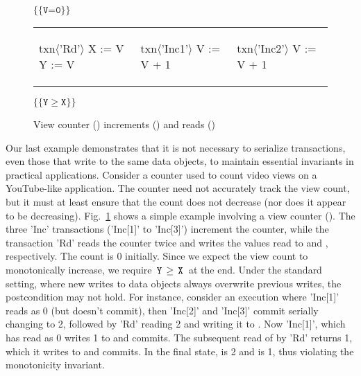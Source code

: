 \begin{figure}[t]
\centering
$\{\{\texttt{V=0}\}\}$
\begin{tabular}{l||l||l}
\begin{txnimpcode}
  txn$\langle$'Rd'$\rangle${
    X := V
    Y := V
  }
\end{txnimpcode}
&
\begin{txnimpcode}
  txn$\langle$'Inc1'$\rangle${
    V := V + 1
  }
\end{txnimpcode}
&
\begin{txnimpcode}
  txn$\langle$'Inc2'$\rangle${
    V := V + 1
  }
\end{txnimpcode}
\\
\end{tabular}
$\{\{\texttt{Y}\ge\texttt{X}\}\}$

\caption{View counter () increments () and reads ()}
\label{fig:motiv-eg-4}
\end{figure}

Our last example demonstrates that it is not necessary to serialize
transactions, even those that write to the same data objects, to
maintain essential invariants in practical applications. Consider a
counter used to count video views on a YouTube-like application. The
counter need not accurately track the view count, but it must at least
ensure that the count does not decrease (nor does it appear to be
decreasing). Fig.~\ref{fig:motiv-eg-4} shows a simple example
involving a view counter (). The three 'Inc' transactions
('Inc[1]' to 'Inc[3]') increment the counter, while the transaction
'Rd' reads the counter twice and writes the values read to  and
, respectively. The count is 0 initially. Since we expect the
view count to monotonically increase, we require $\,{\tt Y}\,\ge\,{\tt X}\,$ at
the end. Under the standard setting, where new writes to data objects
always overwrite previous writes, the postcondition may not hold. For
instance, consider an execution where 'Inc[1]' reads  as 0 (but
doesn't commit), then 'Inc[2]' and 'Inc[3]' commit serially changing
 to 2, followed by 'Rd' reading 2 and writing it to . Now
'Inc[1]', which has read  as 0 writes 1 to  and commits. The
subsequent read of  by 'Rd' returns 1, which it writes to 
and commits. In the final state,  is 2 and  is 1, thus
violating the monotonicity invariant.

